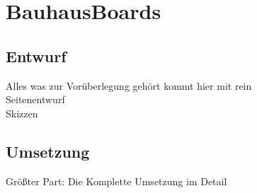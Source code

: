 \chapter{BauhausBoards}\label{BauhausBoards}
\section{Entwurf}\label{Entwurf}
Alles was zur Vorüberlegung gehört kommt hier mit rein\\
Seitenentwurf\\
Skizzen\\


\section{Umsetzung}\label{Umsetzung}
Größter Part: Die Komplette Umsetzung im Detail

%
%


